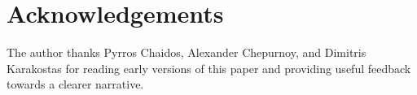 \section{Acknowledgements}

The author thanks Pyrros Chaidos, Alexander Chepurnoy, and Dimitris Karakostas for reading early versions of this
paper and providing useful feedback towards a clearer narrative.

